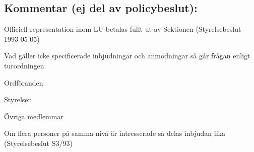 \documentclass[../_main/handlingar.tex]{subfiles}
\begin{document}
\newpage
\subsection*{Kommentar (ej del av policybeslut):}
\begin{dashlist}
\item Officiell representation inom LU betalas fullt ut av Sektionen
(Styrelsebeslut 1993-05-05)
\item Vad gäller icke specificerade inbjudningar och anmodningar så går
frågan enligt turordningen
\begin{numplist}
\item Ordföranden
\item Styrelsen
\item Övriga medlemmar
\end{numplist}
\item Om flera personer på samma nivå är intresserade så delas inbjudan lika
(Styrelsebeslut S3/93)
\end{dashlist}
\end{document}
